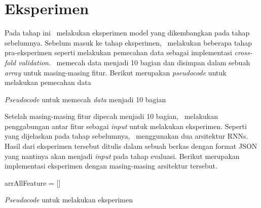 \section{Eksperimen}
Pada tahap ini \saya~melakukan eksperimen model yang dikembangkan pada tahap sebelumnya. Sebelum masuk ke tahap eksperimen, \saya~melakukan beberapa tahap pra-eksperimen seperti melakukan pemecahan data sebagai implementasi \textit{cross-fold validation}. \Saya~memecah data menjadi 10 bagian dan disimpan dalam sebuah \textit{array} untuk masing-masing fitur. Berikut merupakan \textit{pseudocode} untuk melakukan pemecahan data

\begin{kode}

	
	
	\caption{\textit{Pseudocode} untuk memecah \textit{data} menjadi 10 bagian}	
	\label{code:split}
\end{kode}

Setelah masing-masing fitur dipecah menjadi 10 bagian, \saya~melakukan penggabungan antar fitur sebagai \textit{input} untuk melakukan eksperimen. Seperti yang dijelaskan pada tahap sebelumnya, \saya~menggunakan dua arsitektur RNNs. Hasil dari eksperimen tersebut ditulis dalam sebuah berkas dengan format JSON yang nantinya akan menjadi \textit{input} pada tahap evaluasi. Berikut merupakan implementasi eksperimen dengan masing-masing arsitektur tersebut.

\begin{kode}
	
	
	arrAllFeature = []\;
	\BlankLine
	
	\caption{\textit{Pseudocode} untuk melakukan eksperimen}
	\label{code:eksperimen}	
\end{kode}

